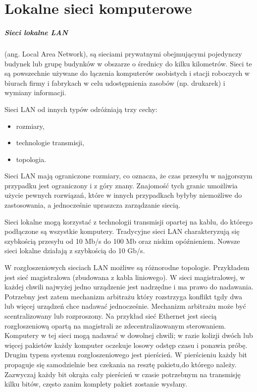\documentclass[a4paper,twoside]{report}
\begin{document}
\chapter{Lokalne sieci komputerowe}
\paragraph{Sieci lokalne LAN} (ang. Local Area Network), są sieciami prywatnymi obejmującymi pojedynczy budynek lub grupę budynków w obszarze o średnicy do kilku kilometrów. Sieci te są powszechnie używane do łączenia komputerów osobistych i stacji roboczych w biurach firmy i fabrykach w celu udostępnienia zasobów (np. drukarek) i wymiany informacji. 

Sieci LAN od innych typów odróżniają trzy cechy:
\begin{itemize}
\item rozmiary,
\item technologie transmisji,
\item topologia.
\end{itemize}

Sieci LAN mają ograniczone rozmiary, co oznacza, że czas przesyłu w najgorszym przypadku jest ograniczony i z góry znany. Znajomość tych granic umożliwia użycie pewnych rozwiązań, które w innych przypadkach byłyby niemożliwe do zastosowania, a jednocześnie upraszcza zarządzanie siecią.


Sieci lokalne mogą korzystać z technologii transmisji opartej na kablu, do którego podłączone są wszystkie komputery. Tradycyjne sieci LAN charakteryzują się szybkością przesyłu od 10 Mb/s do 100 Mb oraz niskim opóźnieniem. Nowsze sieci lokalne działają z szybkością do 10 Gb/s. 

W rozgłoszeniowych sieciach LAN możliwe są różnorodne topologie. Przykładem jest sieć magistralowa (zbudowana z kabla liniowego). W sieci magistralowej, w każdej chwili najwyżej jedno urządzenie jest nadrzędne i ma prawo do nadawania. Potrzebny jest zatem mechanizm arbitrażu który rozstrzyga konflikt tgdy dwa lub więcej urządzeń chce nadawać jednocześnie. Mechanizm arbitrażu może być scentralizowany lub rozproszony. Na przykład sieć Ethernet jest siecią rozgłoszeniową opartą na magistrali ze zdecentralizowanym sterowaniem. Komputery w tej sieci mogą nadawać w dowolnej chwili; w razie kolizji dwóch lub więcej pakietów każdy komputer oczekuje losowy odstęp czasu i ponawia próbę. Drugim typem systemu rozgłoszeniowego jest pierścień. W pierścieniu każdy bit propaguje się samodzielnie bez czekania na resztę pakietu,do którego należy. Zazwyczaj każdy bit okrąża cały pierścień w czasie potrzebnym na transmisję kilku bitów, często zanim komplety pakiet zostanie wysłany.
\end{document}

